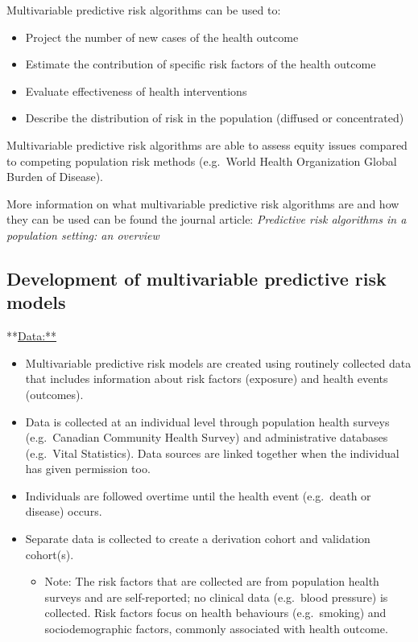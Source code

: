 \documentclass[]{book}
\providecommand{\tightlist}{%
  \setlength{\itemsep}{0pt}\setlength{\parskip}{0pt}}
\begin{document}
Multivariable predictive risk algorithms can be used to:

\begin{itemize}
\tightlist
\item
  Project the number of new cases of the health outcome
\item
  Estimate the contribution of specific risk factors of the health
  outcome
\item
  Evaluate effectiveness of health interventions
\item
  Describe the distribution of risk in the population (diffused or
  concentrated)
\end{itemize}

Multivariable predictive risk algorithms are able to assess equity
issues compared to competing population risk methods (e.g.~World Health
Organization Global Burden of Disease).

More information on what multivariable predictive risk algorithms are
and how they can be used can be found the journal article:
\emph{Predictive risk algorithms in a population setting: an overview}
\citep{PoRTover}

\subsection{Development of multivariable predictive risk
models}\label{development-of-multivariable-predictive-risk-models}

**\url{Data:**}

\begin{itemize}
\item
  Multivariable predictive risk models are created using routinely
  collected data that includes information about risk factors (exposure)
  and health events (outcomes).
\item
  Data is collected at an individual level through population health
  surveys (e.g.~Canadian Community Health Survey) and administrative
  databases (e.g.~Vital Statistics). Data sources are linked together
  when the individual has given permission too.
\item
  Individuals are followed overtime until the health event (e.g.~death
  or disease) occurs.
\item
  Separate data is collected to create a derivation cohort and
  validation cohort(s).

  \begin{itemize}
  \tightlist
  \item
    Note: The risk factors that are collected are from population health
    surveys and are self-reported; no clinical data (e.g.~blood
    pressure) is collected. Risk factors focus on health behaviours
    (e.g.~smoking) and sociodemographic factors, commonly associated
    with health outcome.
  \end{itemize}
\end{itemize}
\end{document}
